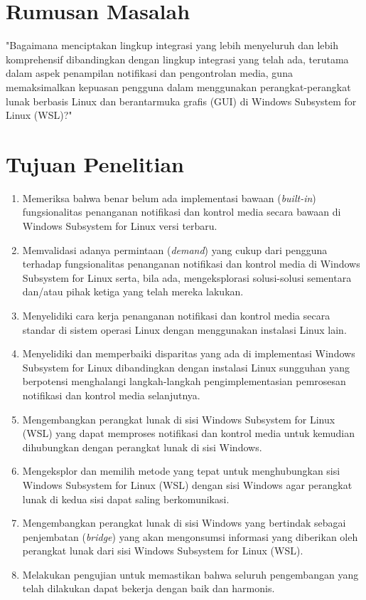 \section{Rumusan Masalah}

"Bagaimana menciptakan lingkup integrasi yang lebih menyeluruh dan lebih komprehensif dibandingkan dengan lingkup integrasi yang telah ada, terutama dalam aspek penampilan notifikasi dan pengontrolan media, guna memaksimalkan kepuasan pengguna dalam menggunakan perangkat-perangkat lunak berbasis Linux dan berantarmuka grafis (GUI) di Windows Subsystem for Linux (WSL)?"


\section{Tujuan Penelitian}

\begin{enumerate}
    \item Memeriksa bahwa benar belum ada implementasi bawaan (\textit{built-in}) fungsionalitas penanganan notifikasi dan kontrol media secara bawaan di Windows Subsystem for Linux versi terbaru.

    \item Memvalidasi adanya permintaan (\textit{demand}) yang cukup dari pengguna terhadap fungsionalitas penanganan notifikasi dan kontrol media di Windows Subsystem for Linux serta, bila ada, mengeksplorasi solusi-solusi sementara dan/atau pihak ketiga yang telah mereka lakukan.

    \item Menyelidiki cara kerja penanganan notifikasi dan kontrol media secara standar di sistem operasi Linux dengan menggunakan instalasi Linux lain.
    
    \item Menyelidiki dan memperbaiki disparitas yang ada di implementasi Windows Subsystem for Linux dibandingkan dengan instalasi Linux sungguhan yang berpotensi menghalangi langkah-langkah pengimplementasian pemrosesan notifikasi dan kontrol media selanjutnya.

    \item Mengembangkan perangkat lunak di sisi Windows Subsystem for Linux (WSL) yang dapat memproses notifikasi dan kontrol media untuk kemudian dihubungkan dengan perangkat lunak di sisi Windows.

    \item Mengeksplor dan memilih metode yang tepat untuk menghubungkan sisi Windows Subsystem for Linux (WSL) dengan sisi Windows agar perangkat lunak di kedua sisi dapat saling berkomunikasi.

    \item Mengembangkan perangkat lunak di sisi Windows yang bertindak sebagai penjembatan (\textit{bridge}) yang akan mengonsumsi informasi yang diberikan oleh perangkat lunak dari sisi Windows Subsystem for Linux (WSL).

    \item Melakukan pengujian untuk memastikan bahwa seluruh pengembangan yang telah dilakukan dapat bekerja dengan baik dan harmonis.
\end{enumerate}

